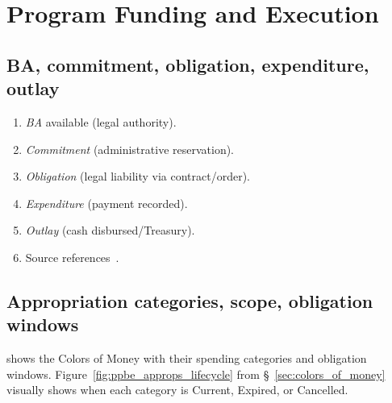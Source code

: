 \documentclass[../main.tex]{subfiles}
\begin{document}

\section{Program Funding and Execution}
\minibib
\subsection{BA, commitment, obligation, expenditure, outlay}
\begin{enumerate}
  \item \emph{BA} available (legal authority).
  \item \emph{Commitment} (administrative reservation).
  \item \emph{Obligation} (legal liability via contract/order).
  \item \emph{Expenditure} (payment recorded).
  \item \emph{Outlay} (cash disbursed/Treasury).
  \item[] Source references~\autocite{DoDFMR-Vol3,Treasury-GInvoicing}.
\end{enumerate}

\subsection{Appropriation categories, scope, obligation windows}
\Tab{\ref{tab:appropriation_categories}} shows the Colors of Money with their spending categories and obligation windows.  Figure~\ref{fig:ppbe_approps_lifecycle} from \S~\ref{sec:colors_of_money} visually shows when each category is Current, Expired, or Cancelled.
\end{document}
